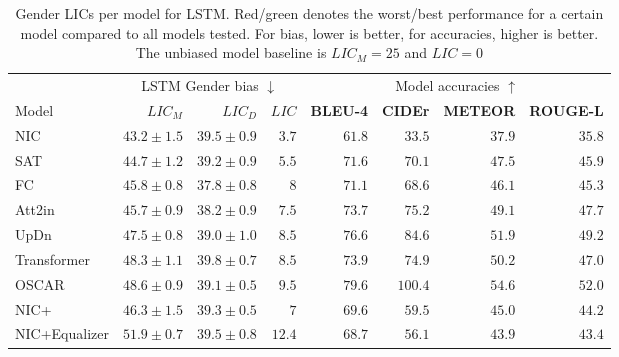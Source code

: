 \begin{table}[H]
\begin{center}
\setlength{\tabcolsep}{4.25pt} %
\renewcommand{\arraystretch}{1.25} %
\begin{tabular}{lrrrrrrr}
\toprule
\multicolumn{1}{c}{} & 
\multicolumn{3}{c}{LSTM Gender bias $\downarrow$} &
\multicolumn{4}{c}{Model accuracies $\uparrow$}

\\\cmidrule(r){2-4} \cmidrule(r){5-8}
Model & $LIC_M$ & $LIC_D$ & $LIC$ & \textbf{BLEU-4} & \textbf{CIDEr} & \textbf{METEOR} & \textbf{ROUGE-L}\\
\hline
NIC \cite{NIC:2015} & $43.2\pm1.5$ & $39.5\pm0.9$ & \textcolor{numbergreen}{$3.7$} & \textcolor{numberred}{$61.8$} & \textcolor{numberred}{$33.5$} & \textcolor{numberred}{$37.9$} & \textcolor{numberred}{$35.8$}\\

SAT \cite{SAT:2015} & $44.7\pm1.2$ & $39.2\pm0.9$ & $5.5$ & $71.6$ & $70.1$ & 
 $47.5$ & $45.9$\\
 
FC \cite{Att2inFC:2016} & $45.8\pm0.8$ & $37.8\pm0.8$ & $8$ & $71.1$ & $68.6$ & $46.1$ & $45.3$ \\

Att2in \cite{Att2inFC:2016} & $45.7\pm0.9$ & $38.2\pm0.9$ & $7.5$ & $73.7$ & $75.2$ & $49.1$ & $47.7$\\

UpDn \cite{UpDn:2017} & $47.5\pm0.8$ & $39.0\pm1.0$ & $8.5$ & $76.6$ & $84.6$ & $51.9$ & $49.2$\\

Transformer \cite{transformer:2017} & $48.3\pm1.1$ & $39.8\pm0.7$ & $8.5$ & $73.9$ & $74.9$ & $50.2$ & $47.0$ \\

OSCAR \cite{OSCAR:2020} & $48.6\pm0.9$ & $39.1\pm0.5$ & $9.5$ & \textcolor{numbergreen}{$79.6$} & \textcolor{numbergreen}{$100.4$} & \textcolor{numbergreen}{$54.6$} & \textcolor{numbergreen}{$52.0$}\\

NIC+ \cite{NICplusNICEqualizer:2018} & $46.3\pm1.5$ & $39.3\pm0.5$ & $7$ & $69.6$ & $59.5$ & $45.0$ & $44.2$\\

NIC+Equalizer \cite{NICplusNICEqualizer:2018} & $51.9\pm0.7$ & $39.5\pm0.8$ & \textcolor{numberred}{$12.4$} & $68.7$ & $56.1$ & $43.9$ & $43.4$\\

\bottomrule
\end{tabular}
\caption{Gender LICs per model for LSTM. Red/green denotes the worst/best performance for a certain model compared to all models tested. For bias, lower is better, for accuracies, higher is better. The unbiased model baseline is $LIC_M = 25$ and $LIC = 0$}
\label{table:lstmgender}
\end{center}
\end{table}

